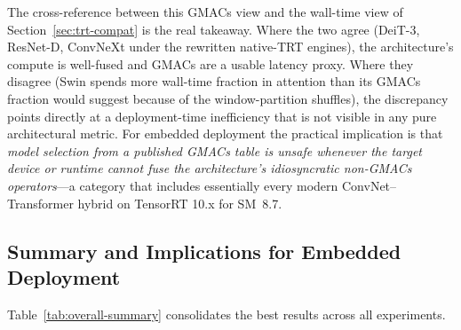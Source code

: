 \documentclass[runningheads,a4paper]{llncs}
\begin{document}
The cross-reference between this GMACs view and the wall-time view of Section~\ref{sec:trt-compat} is the real takeaway. Where the two agree (DeiT-3, ResNet-D, ConvNeXt under the rewritten native-TRT engines), the architecture's compute is well-fused and GMACs are a usable latency proxy. Where they disagree (Swin spends more wall-time fraction in attention than its GMACs fraction would suggest because of the window-partition shuffles), the discrepancy points directly at a deployment-time inefficiency that is not visible in any pure architectural metric. For embedded deployment the practical implication is that \emph{model selection from a published GMACs table is unsafe whenever the target device or runtime cannot fuse the architecture's idiosyncratic non-GMACs operators}---a category that includes essentially every modern ConvNet--Transformer hybrid on TensorRT 10.x for SM~8.7.

\subsection{Summary and Implications for Embedded Deployment}

Table~\ref{tab:overall-summary} consolidates the best results across all experiments.
\end{document}
